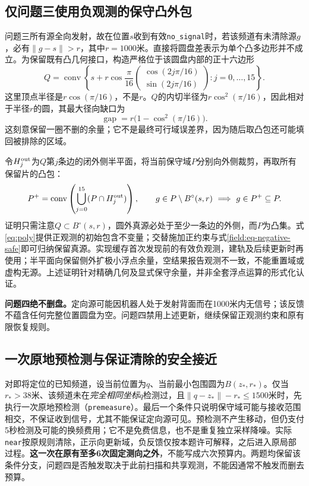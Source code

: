 \subsection{仅问题三使用负观测的保守凸外包}
\label{field:sec-negative}
问题三所有源全向发射，故在位置$s$收到有效\texttt{no\_signal}时，若该频道有未清除源$g$，必有$\|g-s\|>r$，其中$r=1000$米。直接将圆盘差表示为单个凸多边形并不成立。为保留既有凸几何接口，构造严格位于该圆盘内部的正十六边形
\begin{equation}
 Q=\operatorname{conv}\left\{s+r\cos\frac\pi{16}
 \begin{pmatrix}\cos(2j\pi/16)\\\sin(2j\pi/16)\end{pmatrix}
 :j=0,\ldots,15\right\}.
 \label{field:eq-negative-polygon}
\end{equation}
这里顶点半径是$r\cos(\pi/16)$，不是$r$。$Q$的内切半径为$r\cos^2(\pi/16)$，因此相对于半径$r$的圆，其最大径向缺口为
\begin{equation}
 \operatorname{gap}=r\bigl(1-\cos^2(\pi/16)\bigr).
 \label{field:eq-negative-gap}
\end{equation}
这刻意保留一圈不删的余量；它不是最终可行域误差界，因为随后取凸包还可能填回被排除的区域。

令$H_j^{\rm out}$为$Q$第$j$条边的闭外侧半平面，将当前保守域$P$分别向外侧裁剪，再取所有保留片的凸包：
\begin{equation}
 P^+=\operatorname{conv}\left(\bigcup_{j=0}^{15}
                 (P\cap H_j^{\rm out})\right),\qquad
 g\in P\setminus B^\circ(s,r)\ \Longrightarrow\ g\in P^+\subseteq P.
 \label{field:eq-negative-safe}
\end{equation}
证明只需注意$Q\subset B^\circ(s,r)$，圆外真源必处于至少一条边的外侧，而$P$为凸集。式\eqref{eq:poly}提供正观测的初始包含不变量；交替施加正约束与式\eqref{field:eq-negative-safe}即可归纳保留真源。实现缓存首次发现前的有效负观测，建轨及后续更新时再使用；半平面向保留侧外扩极小浮点余量，空结果报告观测不一致，不能重置域或虚构无源。上述证明针对精确几何及显式保守余量，并非全套浮点运算的形式化认证。

\textbf{问题四绝不删盘。}定向源可能因机器人处于发射背面而在1000米内无信号；该反馈不蕴含任何完整位置圆盘为空。问题四禁用上述更新，继续保留正观测约束和原有限恢复规则。

\subsection{一次原地预检测与保证清除的安全接近}
\label{field:sec-local}
对即将定位的已知频道，设当前位置为$q$、当前最小包围圆为$B(z_*,r_*)$。仅当$r_*>38$米、该频道未在\emph{完全相同坐标}$q$检测过，且$\|q-z_*\|-r_*\le1500$米时，先执行一次原地预检测（\texttt{premeasure}）。最后一个条件只说明保守域可能与接收范围相交，不保证收到信号，尤其不能保证定向源可见。预检测不产生移动，但仍支付5秒检测及可能的换频费用；它不是免费信息，也不是重复独立采样降噪。实际\texttt{near}按原规则清除，正示向更新域，负反馈仅按本题许可解释，之后进入原局部过程。\textbf{这一次在原有至多6次固定测向之外}，不能写成六次预算内。两题均保留该条件分支，问题四是否触发取决于此前扫描和共享观测，不能因通常不触发而删去预算。

